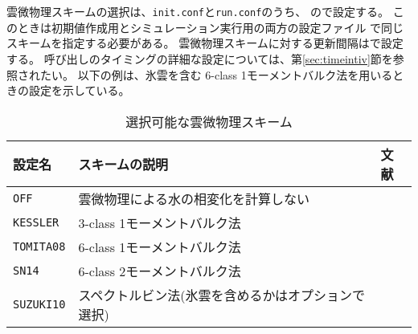 \section{\SubsecMicrophysicsSetting} \label{sec:basic_usel_microphys}
雲微物理スキームの選択は、\verb|init.conf|と\verb|run.conf|のうち、
ので設定する。
このときは初期値作成用とシミュレーション実行用の両方の設定ファイル
で同じスキームを指定する必要がある。
雲微物理スキームに対する更新間隔はで設定する。
呼び出しのタイミングの詳細な設定については、第\ref{sec:timeintiv}節を参照されたい。
以下の例は、氷雲を含む 6-class 1モーメントバルク法を用いるときの設定を示している。\\


\begin{table}[h]
\begin{center}
  \caption{選択可能な雲微物理スキーム}
  \label{tab:nml_atm_mp}
  \begin{tabularx}{150mm}{lXX} \hline
    \rowcolor[gray]{0.9}  設定名 & スキームの説明 & 文献\\ \hline
     \verb|OFF|      & 雲微物理による水の相変化を計算しない &  \\
     \verb|KESSLER|  & 3-class 1モーメントバルク法 & \citet{kessler_1969} \\
     \verb|TOMITA08| & 6-class 1モーメントバルク法 & \citet{tomita_2008} \\
     \verb|SN14|     & 6-class 2モーメントバルク法 & \citet{sn_2014} \\
     \verb|SUZUKI10| & スペクトルビン法(氷雲を含めるかはオプションで選択) & \citet{suzuki_etal_2010} \\
    \hline
  \end{tabularx}
\end{center}
\end{table}

